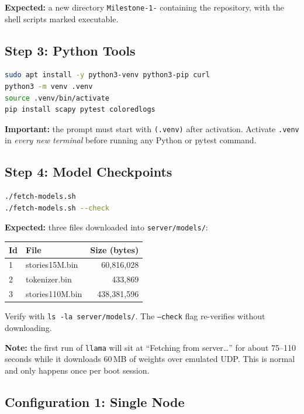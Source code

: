 \documentclass[11pt,a4paper]{article}
\begin{document}
\textbf{Expected:} a new directory \texttt{Milestone-1-} containing the repository, with the shell scripts marked executable.

\subsection{Step 3: Python Tools}

\begin{lstlisting}[language=bash]
sudo apt install -y python3-venv python3-pip curl
python3 -m venv .venv
source .venv/bin/activate
pip install scapy pytest coloredlogs
\end{lstlisting}

\textbf{Important:} the prompt must start with \texttt{(.venv)} after activation. Activate \texttt{.venv} in \emph{every new terminal} before running any Python or pytest command.

\subsection{Step 4: Model Checkpoints}

\begin{lstlisting}[language=bash]
./fetch-models.sh
./fetch-models.sh --check
\end{lstlisting}

\textbf{Expected:} three files downloaded into \texttt{server/models/}:
\begin{center}
\begin{tabular}{llr}
\toprule
Id & File & Size (bytes) \\
\midrule
1 & stories15M.bin & 60,816,028 \\
2 & tokenizer.bin   & 433,869 \\
3 & stories110M.bin & 438,381,596 \\
\bottomrule
\end{tabular}
\end{center}
Verify with \texttt{ls -la server/models/}. The \texttt{--check} flag re-verifies without downloading.

\textbf{Note:} the first run of \texttt{llama} will sit at ``Fetching from server\ldots'' for about 75--110 seconds while it downloads 60\,MB of weights over emulated UDP. This is normal and only happens once per boot session.

\subsection{Configuration 1: Single Node}
\end{document}
